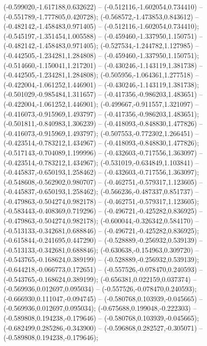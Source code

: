  (-0.599020,-1.617188,0.632622) -- (-0.512116,-1.602054,0.734410) -- (-0.551789,-1.777805,0.420728);
 (-0.568572,-1.473853,0.843612) -- (-0.482142,-1.458483,0.971405) -- (-0.512116,-1.602054,0.734410);
 (-0.545197,-1.351454,1.005588) -- (-0.459460,-1.337950,1.150751) -- (-0.482142,-1.458483,0.971405);
 (-0.527534,-1.244782,1.127985) -- (-0.442505,-1.234281,1.284808) -- (-0.459460,-1.337950,1.150751);
 (-0.514660,-1.150041,1.217201) -- (-0.430246,-1.143119,1.381738) -- (-0.442505,-1.234281,1.284808);
 (-0.505956,-1.064361,1.277518) -- (-0.422004,-1.061252,1.446901) -- (-0.430246,-1.143119,1.381738);
 (-0.501029,-0.985484,1.311657) -- (-0.417356,-0.986203,1.483651) -- (-0.422004,-1.061252,1.446901);
 (-0.499667,-0.911557,1.321097) -- (-0.416073,-0.915969,1.493797) -- (-0.417356,-0.986203,1.483651);
 (-0.501811,-0.840983,1.306239) -- (-0.418093,-0.848830,1.477826) -- (-0.416073,-0.915969,1.493797);
 (-0.507553,-0.772302,1.266451) -- (-0.423514,-0.783212,1.434967) -- (-0.418093,-0.848830,1.477826);
 (-0.517143,-0.704089,1.199996) -- (-0.432603,-0.717556,1.363097) -- (-0.423514,-0.783212,1.434967);
 (-0.531019,-0.634849,1.103841) -- (-0.445837,-0.650193,1.258462) -- (-0.432603,-0.717556,1.363097);
 (-0.548608,-0.562902,0.980707) -- (-0.462751,-0.579317,1.123605) -- (-0.445837,-0.650193,1.258462);
 (-0.566236,-0.487337,0.851737) -- (-0.479863,-0.504274,0.982178) -- (-0.462751,-0.579317,1.123605);
 (-0.583443,-0.408369,0.719296) -- (-0.496721,-0.425282,0.836925) -- (-0.479863,-0.504274,0.982178);
 (-0.600044,-0.326342,0.584170) -- (-0.513133,-0.342681,0.688846) -- (-0.496721,-0.425282,0.836925);
 (-0.615844,-0.241695,0.447290) -- (-0.528889,-0.256932,0.539139) -- (-0.513133,-0.342681,0.688846);
 (-0.630638,-0.154963,0.309720) -- (-0.543765,-0.168624,0.389199) -- (-0.528889,-0.256932,0.539139);
 (-0.644218,-0.066773,0.172651) -- (-0.557526,-0.078470,0.240593) -- (-0.543765,-0.168624,0.389199);
 (-0.656381,0.022159,0.037374) -- (-0.569936,0.012697,0.095034) -- (-0.557526,-0.078470,0.240593);
 (-0.666930,0.111047,-0.094745) -- (-0.580768,0.103939,-0.045665) -- (-0.569936,0.012697,0.095034);
 (-0.675688,0.199048,-0.222303) -- (-0.589808,0.194238,-0.179646) -- (-0.580768,0.103939,-0.045665);
 (-0.682499,0.285286,-0.343900) -- (-0.596868,0.282527,-0.305071) -- (-0.589808,0.194238,-0.179646);
